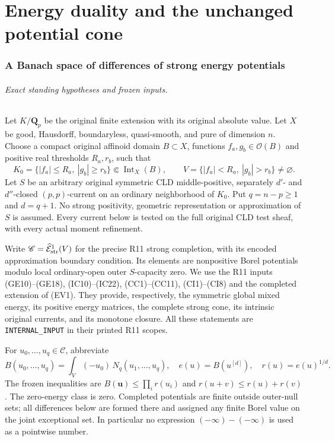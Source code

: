 \documentclass[11pt,a4paper]{article}
\numberwithin{equation}{section}
\theoremstyle{definition}
\theoremstyle{remark}
\begin{document}


\part{Energy duality and the unchanged potential cone}

\section{A Banach space of differences of strong energy potentials}
\label{sec:r12-energy-difference}

\paragraph{Exact standing hypotheses and frozen inputs.}
Let $K/\mathbf Q_p$ be the original finite extension with its original
absolute value. Let $X$ be good, Hausdorff, boundaryless, quasi-smooth,
and pure of dimension $n$. Choose a compact original affinoid domain
$B\subset X$, functions $f_a,g_b\in\mathcal O(B)$ and positive real
thresholds $R_a,r_b$, such that
\[
 K_0=\{|f_a|\leq R_a,\ |g_b|\geq r_b\}
                         \Subset\operatorname{Int}_X(B),\qquad
 V=\{|f_a|<R_a,\ |g_b|>r_b\}\ne\varnothing .
 \tag{ED1}
\]
Let $S$ be an arbitrary original symmetric CLD middle-positive,
separately $d'$- and $d''$-closed $(p,p)$-current on an ordinary
neighborhood of $K_0$. Put $q=n-p\geq1$ and $d=q+1$.
No strong positivity, geometric representation or approximation of
$S$ is assumed. Every current below is tested on the full original
CLD test sheaf, with every actual moment refinement.

Write $\mathscr C=\widehat{\mathcal E}^{1}_{\rm str}(V)$ for the
precise R11 strong completion, with its encoded approximation
boundary condition. Its elements are nonpositive Borel potentials
modulo local ordinary-open outer $S$-capacity zero. We use the R11
inputs (GE10)--(GE18), (IC10)--(IC22), (CC1)--(CC11), (CI1)--(CI8)
and the completed extension of (EV1). They provide, respectively,
the symmetric global mixed energy, its positive energy matrices,
the complete strong cone, its intrinsic original currents, and its
monotone closure. All these statements are \texttt{INTERNAL\_INPUT}
in their printed R11 scopes.

For $u_0,\ldots,u_q\in\mathscr C$, abbreviate
\[
 B(u_0,\ldots,u_q)=\int_V(-u_0)\,\widehat N_q(u_1,\ldots,u_q),
 \quad e(u)=B(u^{[d]}),\quad r(u)=e(u)^{1/d}.
 \tag{ED2}
\]
The frozen inequalities are $B(\mathbf u)\leq\prod_i r(u_i)$ and
$r(u+v)\leq r(u)+r(v)$. The zero-energy class is zero. Completed
potentials are finite outside outer-null sets; all differences below
are formed there and assigned any finite Borel value on the joint
exceptional set. In particular no expression $(-\infty)-(-\infty)$
is used as a pointwise number.
\end{document}
